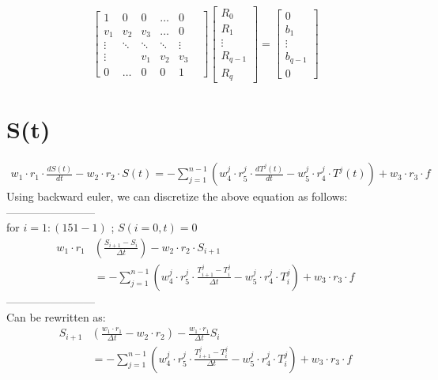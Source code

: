 \documentclass{article}
\def\ds{\displaystyle}
\begin{document}
\begin{equation}
\begin{bmatrix}
1    & 0    &  0        & \dots & 0 \\
v_1    &  v_2    &  v_3    & \dots & 0 \\
\vdots&  \ddots& \ddots & \ddots & \vdots  \\
\vdots&  & v_1  & v_2   &  v_3 & \\
0        & \dots&      0       &  0     & 1 &
\end{bmatrix}
\begin{bmatrix}
R_0 \\ R_1 \\ \vdots \\R_{q-1} \\R_q
\end{bmatrix}
= \begin{bmatrix}
0 \\ b_1 \\ \vdots \\ b_{q-1} \\ 0
\end{bmatrix}
\end{equation}

\newpage
\section*{S(t)}
\begin{align}
w_1 \cdot r_1 \cdot \frac{dS(t)}{dt} - w_2 \cdot r_2 \cdot S(t) = -\ds\sum_{j=1}^{n-1} \left( w_4^j \cdot r_5^j \cdot \frac{dT^j(t)}{dt} - w_5^j \cdot r_4^j \cdot T^j(t) \right) + w_3 \cdot r_3 \cdot f
\end{align}
Using backward euler, we can discretize the above equation as follows:  \\
------------------------\\
for $i=1:(151-1)$ ; $S(i=0,t) = 0$ 
\begin{align}
w_1 \cdot r_1 & \left( \frac{S_{i+1} - S_i}{\Delta t} \right) - w_2 \cdot r_2 \cdot S_{i+1} \nonumber \\
& = -\ds\sum_{j=1}^{n-1} \left( w_4^j \cdot r_5^j \cdot \frac{T^j_{i+1} - T^j_i}{\Delta t} - w_5^j \cdot r_4^j \cdot T^j_i \right) + w_3 \cdot r_3 \cdot f
\end{align}
------------------------\\
Can be rewritten as:
\begin{align}
S_{i+1} & \left( \frac{w_1 \cdot r_1}{\Delta t} - w_2 \cdot r_2 \right) - \frac{w_1 \cdot r_1}{\Delta t}S_i \nonumber \\ 
& = - \ds\sum_{j=1}^{n-1} \left( w_4^j \cdot r_5^j \cdot \frac{T^j_{i+1} - T^j_i}{\Delta t} - w_5^j \cdot r_4^j \cdot T^j_i \right) + w_3 \cdot r_3 \cdot f
\end{align}
\end{document}
